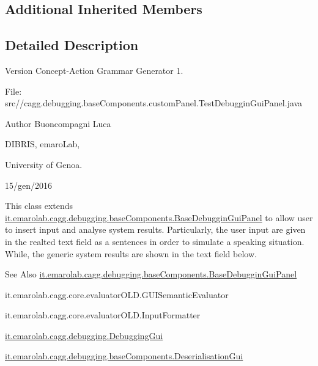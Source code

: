 \subsection*{Additional Inherited Members}


\subsection{Detailed Description}
\begin{DoxyVersion}{Version}
Concept-\/\-Action Grammar Generator 1. \par
 File\-: src//cagg.debugging.\-base\-Components.\-custom\-Panel.\-Test\-Debuggin\-Gui\-Panel.\-java \par

\end{DoxyVersion}
\begin{DoxyAuthor}{Author}
Buoncompagni Luca \par
 D\-I\-B\-R\-I\-S, emaro\-Lab,\par
 University of Genoa. \par
 15/gen/2016 \par

\end{DoxyAuthor}


This class extends \hyperlink{classit_1_1emarolab_1_1cagg_1_1debugging_1_1baseComponents_1_1BaseDebugginGuiPanel}{it.\-emarolab.\-cagg.\-debugging.\-base\-Components.\-Base\-Debuggin\-Gui\-Panel} to allow user to insert input and analyse system results. Particularly, the user input are given in the realted text field as a sentences in order to simulate a speaking situation. While, the generic system results are shown in the text field below. 

\begin{DoxySeeAlso}{See Also}
\hyperlink{classit_1_1emarolab_1_1cagg_1_1debugging_1_1baseComponents_1_1BaseDebugginGuiPanel}{it.\-emarolab.\-cagg.\-debugging.\-base\-Components.\-Base\-Debuggin\-Gui\-Panel} 

it.\-emarolab.\-cagg.\-core.\-evaluator\-O\-L\-D.\-G\-U\-I\-Semantic\-Evaluator 

it.\-emarolab.\-cagg.\-core.\-evaluator\-O\-L\-D.\-Input\-Formatter 

\hyperlink{classit_1_1emarolab_1_1cagg_1_1debugging_1_1DebuggingGui}{it.\-emarolab.\-cagg.\-debugging.\-Debugging\-Gui} 

\hyperlink{classit_1_1emarolab_1_1cagg_1_1debugging_1_1baseComponents_1_1DeserialisationGui}{it.\-emarolab.\-cagg.\-debugging.\-base\-Components.\-Deserialisation\-Gui} 
\end{DoxySeeAlso}


